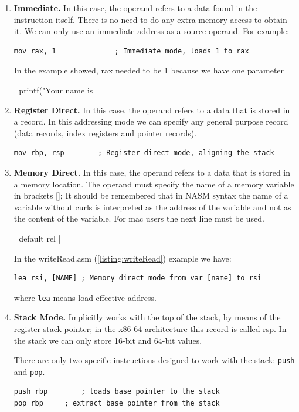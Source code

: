 \begin{enumerate}
\item \textbf{Immediate.} In this case, the operand refers to a data found in the instruction itself. There is no need to do any extra memory access to obtain it. We can only use an immediate address as a source operand. For example:

\begin{verbatim}
mov rax, 1				; Immediate mode, loads 1 to rax
\end{verbatim}

In the example showed, rax needed to be 1 because we have one parameter 

| printf("Your name is %

\item \textbf{Register Direct.} In this case, the operand refers to a data that is stored in a record. In this addressing mode we can specify any general purpose record (data records, index registers and pointer records).

\begin{verbatim}
mov rbp, rsp		; Register direct mode, aligning the stack
\end{verbatim}

\item \textbf{Memory Direct.} In this case, the operand refers to a data that is stored in a memory location. The operand must specify the name of a memory variable in brackets []; It should be remembered that in NASM syntax the name of a variable without curls is interpreted as the address of the variable and not as the content of the variable. For mac users the next line must be used.

| default rel |

In the writeRead.asm (\ref{listing:writeRead}) example we have:

\begin{verbatim}
lea rsi, [NAME]	; Memory direct mode from var [name] to rsi
\end{verbatim}

where \texttt{lea} means load effective address.

\item \textbf{Stack Mode.} Implicitly works with the top of the stack, by means of the register stack pointer; in the x86-64 architecture this record is called rsp. In the stack we can only store 16-bit and 64-bit values.

There are only two specific instructions designed to work with the stack: \texttt{push} and \texttt{pop}.

\begin{verbatim}
push rbp		; loads base pointer to the stack
pop rbp		; extract base pointer from the stack
\end{verbatim}
\end{enumerate}

